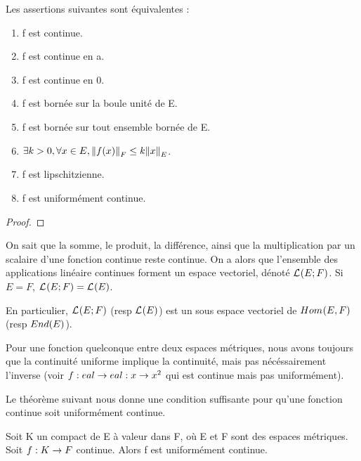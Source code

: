 \begin{proposition}
	Les assertions suivantes sont équivalentes :

	\begin{enumerate}
		\item f est continue.
		\item f est continue en a.
		\item f est continue en 0.
		\item f est bornée sur la boule unité de E.
		\item f est bornée sur tout ensemble bornée de E.
		\item $\exists k > 0, \forall x \in E, \norm{f(x)}_{F} \leq k
			\norm{x}_{E}$.
		\item f est lipschitzienne.
		\item f est uniformément continue.
	\end{enumerate}
\end{proposition}

\ifdefined\outputproof
\begin{proof}

\end{proof}
\fi

On sait que la somme, le produit, la différence, ainsi que la multiplication par
un scalaire d'une fonction continue reste continue. On a alors que l'ensemble
des applications linéaire continues forment un espace vectoriel, dénoté
$\mathcal{L}_{}(E; F)$. Si $E = F$, $\mathcal{L}_{}(E; F) =
\mathcal{L}_{}(E)$.

En particulier, $\mathcal{L}_{}(E; F)$ (resp $\mathcal{L}_{}(E)$) est un sous
espace vectoriel de $Hom_{}(E, F)$ (resp $End(E)$).

\begin{remarque}
	Pour une fonction quelconque entre deux espaces métriques, nous avons
	toujours que la continuité uniforme implique la continuité, mais pas
	nécéssairement l'inverse (voir $f : 
eal \rightarrow 
eal : x \rightarrow x^2$ qui est continue mais pas uniformément).
\end{remarque}

Le théorème suivant nous donne une condition suffisante pour qu'une fonction
continue soit uniformément continue.

\begin{theorem} [Heine]
	Soit K un compact de E à valeur dans F, où E et F sont des espaces
	métriques. Soit $f : K \rightarrow F$ continue. Alors f est uniformément
	continue.
	\label{Heine}
\end{theorem}

